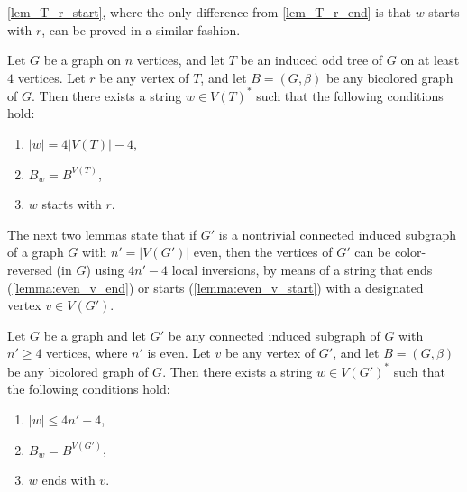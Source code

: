 \documentclass[runningheads,orivec]{llncs}
\begin{document}
\autoref{lem_T_r_start}, where the only difference from \autoref{lem_T_r_end} is that $w$ starts with $r$, can be proved in a similar fashion.

\begin{lemma}\label{lem_T_r_start}
Let $G$ be a graph on $n$ vertices, and let $T$ be an induced odd tree of $G$ on at least $4$ vertices. 
Let $r$ be any vertex of $T$, and let $B = (G, \beta)$ be any bicolored graph of $G$. 
Then there exists a string $w \in V(T)^*$ such that the following conditions hold:
\begin{enumerate}
    \item $|w| = 4|V(T)|-4$,
    \item $B_w = B^{V(T)}$,
    \item $w$ starts with $r$.
\end{enumerate}
\end{lemma}

The next two lemmas state that if $G'$ is a nontrivial connected induced subgraph of a graph $G$ with $n' = |V(G')|$ even, then the vertices of $G'$ can be color-reversed (in $G$) using $4n'-4$ local inversions, by means of a string that ends (\autoref{lemma:even_v_end}) or starts (\autoref{lemma:even_v_start}) with a designated vertex $v\in V(G')$.

\begin{lemma}\label{lemma:even_v_end}
Let $G$ be a graph and let $G'$ be any connected induced subgraph of $G$ with $n' \geq 4$ vertices, where $n'$ is even. 
Let $v$ be any vertex of $G'$, and let $B = (G, \beta)$ be any bicolored graph of $G$. 
Then there exists a string $w \in V(G')^*$ such that the following conditions hold:
\begin{enumerate}
    \item $|w| \leq 4n'-4$,
    \item $B_w = B^{V(G')}$,
    \item $w$ ends with $v$.
\end{enumerate}
\end{lemma}
\end{document}
